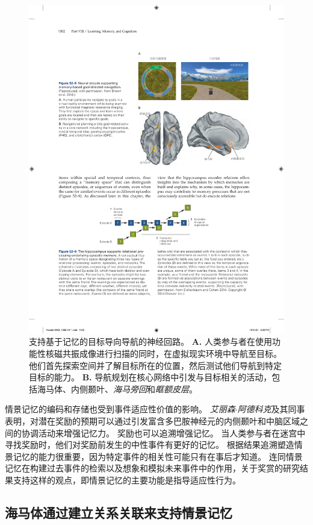 \begin{figure}[htbp]
	\centering
	\includegraphics[width=0.78\linewidth]{chap52/fig_52_8}
	\caption{支持基于记忆的目标导向导航的神经回路\cite{brown2016prospective}。
		\textbf{A.} 人类参与者在使用功能性核磁共振成像进行扫描的同时，在虚拟现实环境中导航至目标。
		他们首先探索空间并了解目标所在的位置，然后测试他们导航到特定目标的能力。
		\textbf{B.} 导航规划在核心网络中引发与目标相关的活动，包括海马体、内侧颞叶、\textit{海马旁回}和\textit{眶额皮层}。}
	\label{fig:52_8}
\end{figure}


情景记忆的编码和存储也受到事件适应性价值的影响。
\textit{艾丽森$\cdot$阿德科克}及其同事表明，对潜在奖励的预期可以通过引发富含多巴胺神经元的内侧颞叶和中脑区域之间的协调活动来增强记忆力。
奖励也可以追溯增强记忆。
当人类参与者在迷宫中寻找奖励时，他们对奖励前发生的中性事件有更好的记忆。
根据结果追溯塑造情景记忆的能力很重要，因为特定事件的相关性可能只有在事后才知道。
连同情景记忆在构建过去事件的检索以及想象和模拟未来事件中的作用，关于奖赏的研究结果支持这样的观点，即情景记忆的主要功能是指导适应性行为。



\subsection{海马体通过建立关系关联来支持情景记忆}

